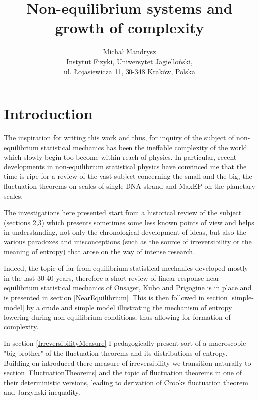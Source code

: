 \documentclass[a4paper,12pt]{article}
\begin{document}
\title{Non-equilibrium systems and growth of complexity}

\author{Michał Mandrysz \\
Instytut Fizyki, Uniwersytet Jagielloński, \\ul. Łojasiewicza
11, 30-348 Kraków, Polska }

\maketitle

\tableofcontents

\newpage

\section{Introduction}

The inspiration for writing this work and thus, for inquiry of the subject of non-equilibrium statistical mechanics has been the ineffable complexity of the world which slowly begin too become within reach of physics. 
In particular, recent developments in non-equilibrium statistical physics have convinced me that the time is ripe for a review of the vast subject concerning the small and the big, the fluctuation theorems on scales of single DNA strand and MaxEP on the planetary scales.

The investigations here presented start from a historical review of the subject (sections 2,3) which presents sometimes some less known points of view and helps in understanding, not only the chronological development of ideas, but also the various paradoxes and misconceptions (such as the source of irreversibility or the meaning of entropy) that arose on the way of intense research. 

Indeed, the topic of far from equilibrium statistical mechanics developed mostly in the last 30-40 years, therefore a short review of linear response near-equilibrium statistical mechanics of Onsager, Kubo and Prigogine is in place and is presented in section \ref{NearEquilibrium}. This is then followed in section \ref{simple-model} by a crude and simple model illustrating the mechanism of entropy lowering during non-equilibrium conditions, thus allowing for formation of complexity.

In section \ref{IrreversibilityMeasure} I pedagogically present sort of a macroscopic "big-brother" of the fluctuation theorems and its distributions of entropy. Building on introduced there measure of irreversibility we transition naturally to section \ref{FluctuationTheorems} and the topic of fluctuation theorems in one of their deterministic versions, leading to derivation of Crooks fluctuation theorem and Jarzynski inequality.
\end{document}
